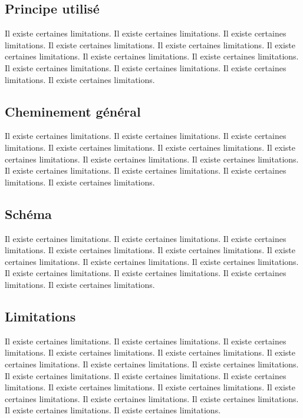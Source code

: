 \documentclass[11pt,a4paper,oneside]{report}
\begin{document}
\subsection{Principe utilisé}

Il existe certaines limitations.
Il existe certaines limitations.
Il existe certaines limitations.
Il existe certaines limitations.
Il existe certaines limitations.
Il existe certaines limitations.
Il existe certaines limitations.
Il existe certaines limitations.
Il existe certaines limitations.
Il existe certaines limitations.
Il existe certaines limitations.
Il existe certaines limitations.

\subsection{Cheminement général}

Il existe certaines limitations.
Il existe certaines limitations.
Il existe certaines limitations.
Il existe certaines limitations.
Il existe certaines limitations.
Il existe certaines limitations.
Il existe certaines limitations.
Il existe certaines limitations.
Il existe certaines limitations.
Il existe certaines limitations.
Il existe certaines limitations.
Il existe certaines limitations.
\subsection{Schéma}

Il existe certaines limitations.
Il existe certaines limitations.
Il existe certaines limitations.
Il existe certaines limitations.
Il existe certaines limitations.
Il existe certaines limitations.
Il existe certaines limitations.
Il existe certaines limitations.
Il existe certaines limitations.
Il existe certaines limitations.
Il existe certaines limitations.
Il existe certaines limitations.
\subsection{Limitations}

Il existe certaines limitations.
Il existe certaines limitations.
Il existe certaines limitations.
Il existe certaines limitations.
Il existe certaines limitations.
Il existe certaines limitations.
Il existe certaines limitations.
Il existe certaines limitations.
Il existe certaines limitations.
Il existe certaines limitations.
Il existe certaines limitations.
Il existe certaines limitations.
Il existe certaines limitations.
Il existe certaines limitations.
Il existe certaines limitations.
Il existe certaines limitations.
Il existe certaines limitations.
Il existe certaines limitations.
\end{document}
